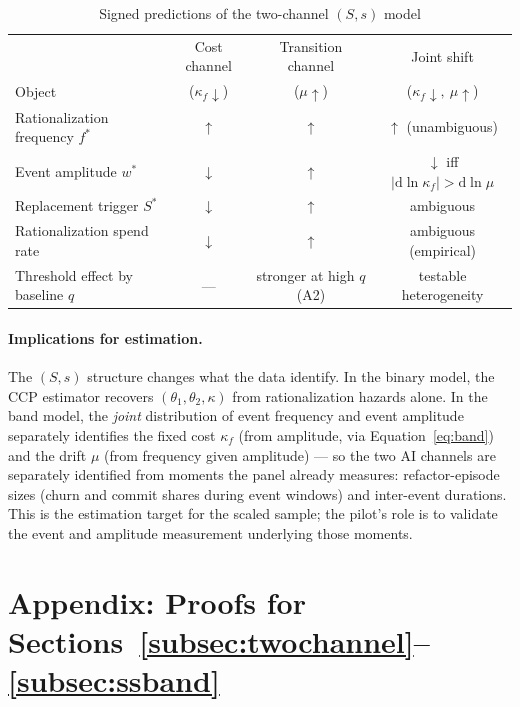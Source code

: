 \begin{table}[t]
\centering
\caption{Signed predictions of the two-channel $(S,s)$ model}
\label{tab:predictions}
\begin{tabular}{lccc}
\hline
 & Cost channel & Transition channel & Joint shift \\
Object & ($\kappa_f \downarrow$) & ($\mu \uparrow$) & ($\kappa_f\downarrow,\ \mu\uparrow$) \\
\hline
Rationalization frequency $f^*$ & $\uparrow$ & $\uparrow$ & $\uparrow$ (unambiguous) \\
Event amplitude $w^*$ & $\downarrow$ & $\uparrow$ & $\downarrow$ iff $|\mathrm{d}\ln\kappa_f| > \mathrm{d}\ln\mu$ \\
Replacement trigger $S^*$ & $\downarrow$ & $\uparrow$ & ambiguous \\
Rationalization spend rate & $\downarrow$ & $\uparrow$ & ambiguous (empirical) \\
Threshold effect by baseline $q$ & --- & stronger at high $q$ (A2) & testable heterogeneity \\
\hline
\end{tabular}
\end{table}

\paragraph{Implications for estimation.}
The $(S,s)$ structure changes what the data identify. In the binary model,
the CCP estimator recovers $(\theta_1, \theta_2, \kappa)$ from
rationalization hazards alone. In the band model, the \emph{joint}
distribution of event frequency and event amplitude separately identifies
the fixed cost $\kappa_f$ (from amplitude, via Equation~\eqref{eq:band})
and the drift $\mu$ (from frequency given amplitude) --- so the two AI
channels are separately identified from moments the panel already
measures: refactor-episode sizes (churn and commit shares during event
windows) and inter-event durations. This is the estimation target for the
scaled sample; the pilot's role is to validate the event and amplitude
measurement underlying those moments.


\section*{Appendix: Proofs for Sections~\ref{subsec:twochannel}--\ref{subsec:ssband}}
\label{app:proofs}

